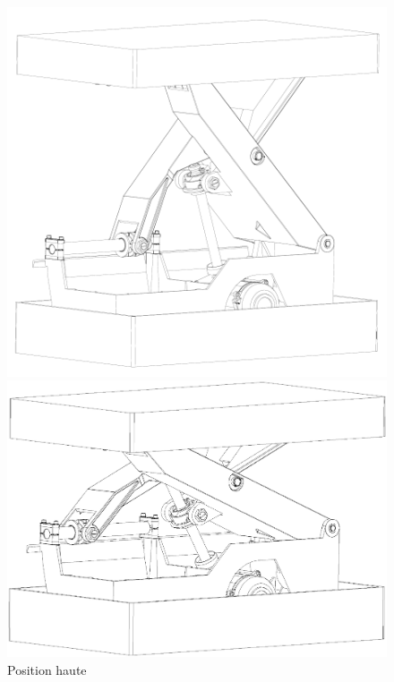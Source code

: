 \begin{figure}[htbp]
\begin{minipage}[c]{.55\linewidth}
\begin{center}
\includegraphics[width=\linewidth]{img/pos_haute.png}
\caption{Position haute}
\label{fig:imagechaise4}
\end{center}
\end{minipage}
\hfill
\begin{minipage}[c]{.4\linewidth}
\begin{center}
\includegraphics[width=\linewidth]{img/perspective.png}

\end{center}
\end{minipage}
\end{figure}
